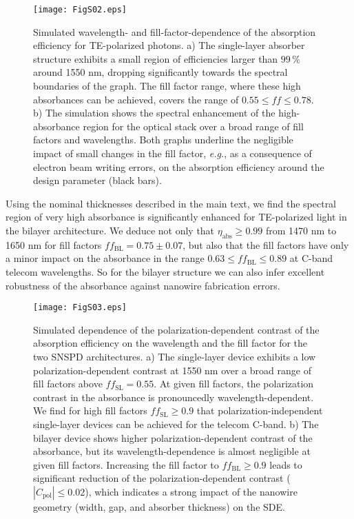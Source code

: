 \documentclass[aip,apl,showpacs,showkeys,preprint,superscriptaddress,preprintnumbers,amsmath,amssymb]{revtex4-1}
\begin{document}
\begin{bibunit}
\begin{figure}
\texttt{[image: FigS02.eps]}
\caption{\label{fig:s02}  Simulated wavelength- and fill-factor-dependence of the absorption efficiency for TE-polarized photons. a) The single-layer absorber structure exhibits a small region of efficiencies larger than $99\,\%$ around 1550 nm, dropping significantly towards the spectral boundaries of the graph. The fill factor range, where these high absorbances can be achieved, covers the range of $0.55\le ff\le0.78$. b) The simulation shows the spectral enhancement of the high-absorbance region for the optical stack over a broad range of fill factors and wavelengths. Both graphs underline the negligible impact of small changes in the fill factor, \textit{e.g.}, as a consequence of electron beam writing errors, on the absorption efficiency around the design parameter (black bars).}
\end{figure}

Using the nominal thicknesses described in the main text, we find the spectral region of very high absorbance is significantly enhanced for TE-polarized light in the bilayer architecture. We deduce not only that $\eta_\mathrm{abs}\ge0.99$ from 1470 nm to 1650 nm for fill factors $ff_\mathrm{BL}=0.75\pm0.07$, but also that the fill factors have only a minor impact on the absorbance in the range $0.63\le ff_\mathrm{BL}\le0.89$ at C-band telecom wavelengths. So for the bilayer structure we can also infer excellent robustness of the absorbance against nanowire fabrication errors.

\begin{figure}
\texttt{[image: FigS03.eps]}
\caption{\label{fig:s03} Simulated dependence of the polarization-dependent contrast of the absorption efficiency on the wavelength and the fill factor for the two SNSPD architectures. a) The single-layer device exhibits a low polarization-dependent contrast at 1550 nm over a broad range of fill factors above $ff_\mathrm{SL}=0.55$. At given fill factors, the polarization contrast in the absorbance is pronouncedly wavelength-dependent. We find for high fill factors $ff_\mathrm{SL}\ge0.9$ that polarization-independent single-layer devices can be achieved for the telecom C-band. b) The bilayer device shows higher polarization-dependent contrast of the absorbance, but its wavelength-dependence is almost negligible at given fill factors. Increasing the fill factor to $ff_\mathrm{BL}\ge0.9$ leads to significant reduction of the polarization-dependent contrast ($|C_\mathrm{pol}|\le0.02$), which indicates a strong impact of the nanowire geometry (width, gap, and absorber thickness) on the SDE.}
\end{figure}


\end{bibunit}
\end{document}
